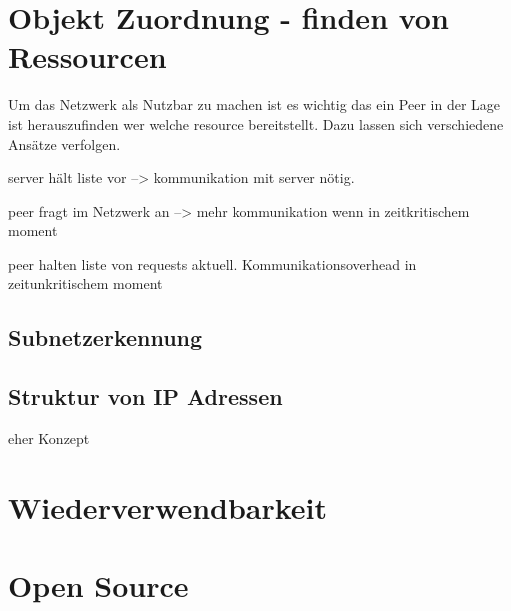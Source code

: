 \section{Objekt Zuordnung - finden von Ressourcen}

Um das \pTp Netzwerk als \cdn Nutzbar zu machen ist es wichtig das ein Peer in der Lage ist herauszufinden wer welche resource bereitstellt. Dazu lassen sich verschiedene Ansätze verfolgen. 

server hält liste vor --> kommunikation mit server nötig. \study

peer fragt im Netzwerk an --> mehr kommunikation wenn in zeitkritischem moment \study

peer halten liste von requests aktuell. Kommunikationsoverhead in zeitunkritischem moment \study



\subsection{Subnetzerkennung}
\subsection{ Struktur von IP Adressen}
eher Konzept


\section{Wiederverwendbarkeit}
\section{Open Source}
%
